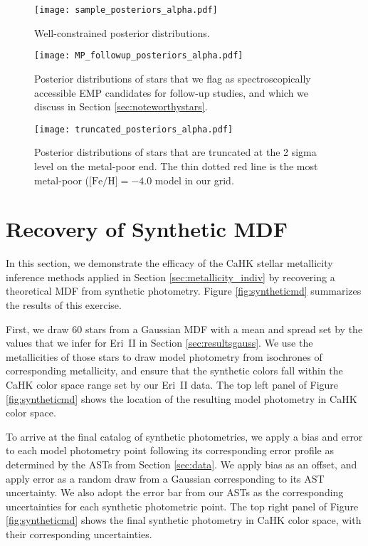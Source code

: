 \documentclass[twocolumn]{aastex63}
\begin{document}
\begin{figure}
    \centering
    \texttt{[image: sample\_posteriors\_alpha.pdf]}
    \caption{Well-constrained posterior distributions.}
    \label{fig:normal_posteriors}
\end{figure}

\begin{figure}
    \centering
    \texttt{[image: MP\_followup\_posteriors\_alpha.pdf]}
    \caption{Posterior distributions of stars that we flag as spectroscopically accessible EMP candidates for follow-up studies, and which we discuss in Section \ref{sec:noteworthystars}. }
    \label{fig:mp_posteriors}
\end{figure}

\begin{figure}
    \centering
    \texttt{[image: truncated\_posteriors\_alpha.pdf]}
    \caption{Posterior distributions of stars that are truncated at the 2 sigma level on the metal-poor end. The thin dotted red line is the most metal-poor ($\mbox{[Fe/H]}=-4.0$ model in our grid. }
    \label{fig:truncated_posteriors}
\end{figure}

\section{Recovery of Synthetic MDF}

\par In this section, we demonstrate the efficacy of the CaHK stellar metallicity inference methods applied in Section \ref{sec:metallicity_indiv} by recovering a theoretical MDF from synthetic photometry. Figure \ref{fig:syntheticmd} summarizes the results of this exercise.

\par First, we draw 60 stars from a Gaussian MDF with a mean and spread set by the values that we infer for Eri~II in Section \ref{sec:resultsgauss}. We use the metallicities of those stars to draw model photometry from isochrones of corresponding metallicity, and ensure that the synthetic colors fall within the CaHK color space range set by our Eri~II data. The top left panel of Figure \ref{fig:syntheticmd} shows the location of the resulting model photometry in CaHK color space.

\par To arrive at the final catalog of synthetic photometries, we apply a bias and error to each model photometry point following its corresponding error profile as determined by the ASTs from Section \ref{sec:data}. We apply bias as an offset, and apply error as a random draw from a Gaussian corresponding to its AST uncertainty. We also adopt the error bar from our ASTs as the corresponding uncertainties for each synthetic photometric point. The top right panel of Figure \ref{fig:syntheticmd} shows the final synthetic photometry in CaHK color space, with their corresponding uncertainties. 
\end{document}
